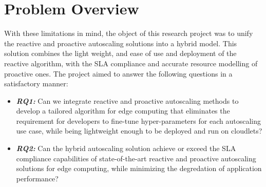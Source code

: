 \section{Problem Overview}

With these limitations in mind, the object of this research project was to unify the reactive and proactive autoscaling solutions into a hybrid model. This solution combines the light weight, and ease of use and deployment of the reactive algorithm, with the SLA compliance and accurate resource modelling of proactive ones. The project aimed to answer the following questions in a satisfactory manner:
\begin{itemize}
    \item \textbf{\textit{RQ1:}} Can we integrate reactive and proactive autoscaling methods to develop a tailored algorithm for edge computing that eliminates the requirement for developers to fine-tune hyper-parameters for each autoscaling use case, while being lightweight enough to be deployed and run on cloudlets?
    \item \textbf{\textit{RQ2:}} Can the hybrid autoscaling solution achieve or exceed the SLA compliance capabilities of state-of-the-art reactive and proactive autoscaling solutions for edge computing, while minimizing the degredation of application performance?
\end{itemize}